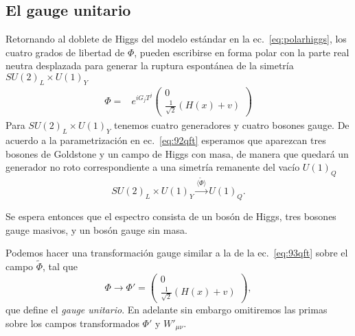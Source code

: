 \subsection{El gauge unitario}

\begin{frame}
Retornando al doblete de Higgs del modelo estándar en la ec.~\eqref{eq:polarhiggs}, los cuatro grados de libertad de $\Phi$, pueden escribirse en forma polar con la parte real neutra desplazada para generar la ruptura espontánea de la simetría $SU(2)_L\times  U(1)_Y$
\begin{align}
\label{eq:92qft}
  {\Phi}=&e^{i G_jT^j}
  \begin{pmatrix}
    0\\
    \frac{1}{\sqrt{2}}(H(x)+v)
  \end{pmatrix}
\end{align}
Para $SU(2)_L\times  U(1)_Y$ tenemos cuatro generadores y cuatro bosones gauge. De acuerdo a la parametrización en ec.~\eqref{eq:92qft} esperamos que aparezcan tres bosones de Goldstone y un campo de Higgs con masa, de manera que quedará un generador no roto correspondiente a una simetría remanente del vacío $U(1)_Q$
\begin{equation}
  SU(2)_L\times  U(1)_Y\overset{\langle\widetilde{\Phi}\rangle}{\longrightarrow}U(1)_Q.
\end{equation}

Se espera entonces que el espectro consista de un bosón de Higgs, tres bosones gauge masivos, y un bosón gauge sin masa.

Podemos hacer una transformación gauge similar a la de la 
ec.~\eqref{eq:93qft} sobre el campo $\widetilde{\Phi}$, tal que
\begin{equation}
  \label{eq:123qft}
    {\Phi}\to{\Phi}'=
  \begin{pmatrix}
    0\\
    \frac{1}{\sqrt{2}}(H(x)+v)
  \end{pmatrix},
\end{equation}
que define el \emph{gauge unitario}. En adelante sin embargo omitiremos las primas sobre los campos transformados ${\Phi}'$ y $W'_{\mu\nu}$.


\end{frame}

